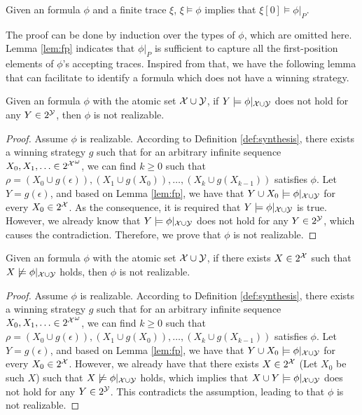 \begin{lemma}\label{lem:fp}
Given an \ltlf formula $\phi$ and a finite trace $\xi$, $\xi\models\phi$ implies that $\xi[0]\models\phi|_P$.
\end{lemma}
The proof can be done by induction over the types of $\phi$, which are omitted here. Lemma \ref{lem:fp} indicates that $\phi|_P$ is sufficient to capture all the first-position elements of $\phi$'s accepting traces. Inspired from that, we have the following lemma that can facilitate to identify a formula which does not have a winning strategy. 

\begin{lemma}\label{lem:failure_state-2}
Given an \ltlf formula $\phi$ with the atomic set $\mathcal{X}\cup \mathcal{Y}$, if $Y\models \phi|_{\mathcal{X}\cup\mathcal{Y}}$ does not hold for any $Y\in 2^{\mathcal{Y}}$, then $\phi$ is not realizable. 
\end{lemma}
\begin{proof}
Assume $\phi$ is realizable. According to Definition \ref{def:synthesis}, there exists a winning strategy $g$ such that for an arbitrary infinite sequence $X_0,X_1,\ldots\in {2^{\mathcal{X}}}^{\omega}$, we can find $k\geq 0$ such that $\rho=(X_0\cup g(\epsilon)),(X_1\cup g(X_0)), \ldots, (X_k\cup g(X_{k-1}))$ satisfies $\phi$. Let $Y = g(\epsilon)$, and based on Lemma \ref{lem:fp}, we have that $Y\cup X_0\models \phi|_{\mathcal{X}\cup\mathcal{Y}}$ for every $X_0\in 2^{\mathcal{X}}$. As the consequence, it is required that $Y\models \phi|_{\mathcal{X}\cup\mathcal{Y}}$ is true. However, we already know that $Y\models \phi|_{\mathcal{X}\cup\mathcal{Y}}$ does not hold for any $Y\in 2^{\mathcal{Y}}$, which causes the contradiction. Therefore, we prove that $\phi$ is not realizable.
\end{proof}

\begin{lemma}\label{lem:failure_state-1}
	Given an \ltlf formula $\phi$ with the atomic set $\mathcal{X}\cup \mathcal{Y}$, if there exists $X\in 2^{\mathcal{X}}$ such that $X\not\models \phi|_{\mathcal{X}\cup\mathcal{Y}}$ holds, then $\phi$ is not realizable. 
\end{lemma}
\begin{proof}
Assume $\phi$ is realizable. According to Definition \ref{def:synthesis}, there exists a winning strategy $g$ such that for an arbitrary infinite sequence $X_0,X_1,\ldots\in {2^{\mathcal{X}}}^{\omega}$, we can find $k\geq 0$ such that $\rho=(X_0\cup g(\epsilon)),(X_1\cup g(X_0)), \ldots, (X_k\cup g(X_{k-1}))$ satisfies $\phi$. Let $Y = g(\epsilon)$, and based on Lemma \ref{lem:fp}, we have that $Y\cup X_0\models \phi|_{\mathcal{X}\cup\mathcal{Y}}$ for every $X_0\in 2^{\mathcal{X}}$. However, we already have that there exists $X\in 2^{\mathcal{X}}$ (Let $X_0$ be such $X$) such that $X\not\models \phi|_{\mathcal{X}\cup\mathcal{Y}}$ holds, which implies that $X\cup Y\models \phi|_{\mathcal{X}\cup\mathcal{Y}}$ does not hold for any $Y\in 2^{\mathcal{Y}}$. This contradicts the assumption, leading to that $\phi$ is not realizable.
\end{proof}


